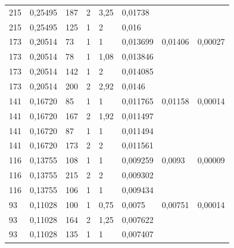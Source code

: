 \documentclass[a4paper, 12pt]{article}%
\begin{document}
\begin{table}[h!]
{\begin{tabular}{|l|l|l|l|l|l|ll|}
215  & 0,25495 & 187  & 2      & 3,25    & 0,01738                    & \multicolumn{1}{l|}{}        &         \\ \cline{1-6}
215  & 0,25495 & 125  & 1      & 2       & 0,016                      & \multicolumn{1}{l|}{}        &         \\ \hline
173  & 0,20514 & 73   & 1      & 1       & 0,013699                   & \multicolumn{1}{l|}{0,01406} & 0,00027 \\ \cline{1-6}
173  & 0,20514 & 78   & 1      & 1,08    & 0,013846                   & \multicolumn{1}{l|}{}        &         \\ \cline{1-6}
173  & 0,20514 & 142  & 1      & 2       & 0,014085                   & \multicolumn{1}{l|}{}        &         \\ \cline{1-6}
173  & 0,20514 & 200  & 2      & 2,92    & 0,0146                     & \multicolumn{1}{l|}{}        &         \\ \hline
141  & 0,16720 & 85   & 1      & 1       & 0,011765                   & \multicolumn{1}{l|}{0,01158} & 0,00014 \\ \cline{1-6}
141  & 0,16720 & 167  & 2      & 1,92    & 0,011497                   & \multicolumn{1}{l|}{}        &         \\ \cline{1-6}
141  & 0,16720 & 87   & 1      & 1       & 0,011494                   & \multicolumn{1}{l|}{}        &         \\ \cline{1-6}
141  & 0,16720 & 173  & 2      & 2       & 0,011561                   & \multicolumn{1}{l|}{}        &         \\ \hline
116  & 0,13755 & 108  & 1      & 1       & 0,009259                   & \multicolumn{1}{l|}{0,0093}  & 0,00009 \\ \cline{1-6}
116  & 0,13755 & 215  & 2      & 2       & 0,009302                   & \multicolumn{1}{l|}{}        &         \\ \cline{1-6}
116  & 0,13755 & 106  & 1      & 1       & 0,009434                   & \multicolumn{1}{l|}{}        &         \\ \hline
93   & 0,11028 & 100  & 1      & 0,75    & 0,0075                     & \multicolumn{1}{l|}{0,00751} & 0,00014 \\ \cline{1-6}
93   & 0,11028 & 164  & 2      & 1,25    & 0,007622                   & \multicolumn{1}{l|}{}        &         \\ \cline{1-6}
93   & 0,11028 & 135  & 1      & 1       & 0,007407                   & \multicolumn{1}{l|}{}        &         \\ \hline
\end{tabular}}
\end{table}
\end{document}
